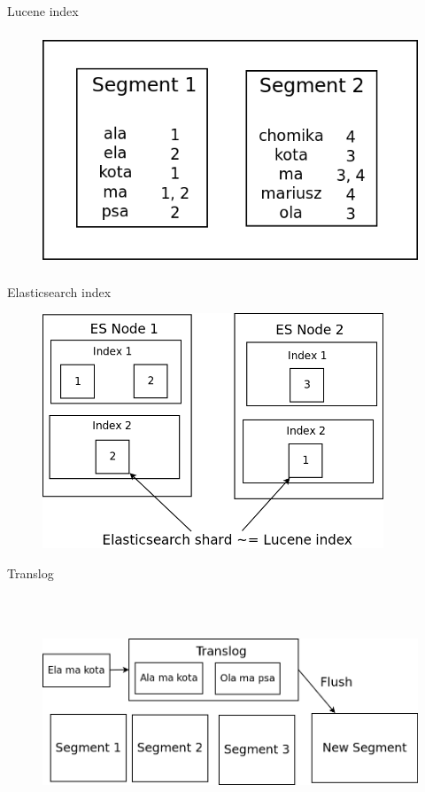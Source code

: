 \documentclass{beamer}
\begin{document}
\begin{frame}{Lucene index}
	\begin{figure}
		\includegraphics[width=\textwidth,height=7cm,keepaspectratio=true]{lucene-index}
	\end{figure}
\end{frame}
\begin{frame}{Elasticsearch index}
	\begin{figure}
		\includegraphics[width=\textwidth,height=7cm,keepaspectratio=true]{elasticsearch-index}
	\end{figure}
\end{frame}
\begin{frame}{Translog}
	\begin{figure}
		\includegraphics[width=\textwidth,height=7cm,keepaspectratio=true]{translog}
	\end{figure}
\end{frame}
\end{document}
